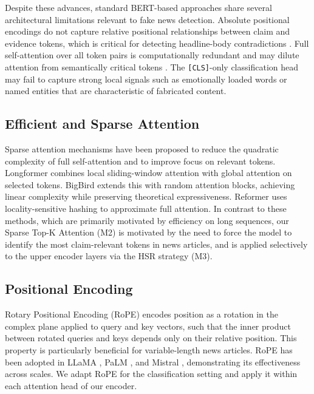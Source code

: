 \documentclass[conference]{IEEEtran}
\begin{document}
Despite these advances, standard BERT-based approaches share several architectural limitations relevant to fake news detection. Absolute positional encodings do not capture relative positional relationships between claim and evidence tokens, which is critical for detecting headline-body contradictions \cite{su2021rope}. Full self-attention over all token pairs is computationally redundant and may dilute attention from semantically critical tokens \cite{zaheer2020bigbird, beltagy2020longformer}. The \texttt{[CLS]}-only classification head may fail to capture strong local signals such as emotionally loaded words or named entities that are characteristic of fabricated content.

\subsection{Efficient and Sparse Attention}

Sparse attention mechanisms have been proposed to reduce the quadratic complexity of full self-attention and to improve focus on relevant tokens. Longformer \cite{beltagy2020longformer} combines local sliding-window attention with global attention on selected tokens. BigBird \cite{zaheer2020bigbird} extends this with random attention blocks, achieving linear complexity while preserving theoretical expressiveness. Reformer \cite{kitaev2020reformer} uses locality-sensitive hashing to approximate full attention. In contrast to these methods, which are primarily motivated by efficiency on long sequences, our Sparse Top-K Attention (M2) is motivated by the need to force the model to identify the most claim-relevant tokens in news articles, and is applied selectively to the upper encoder layers via the HSR strategy (M3).

\subsection{Positional Encoding}

Rotary Positional Encoding (RoPE) \cite{su2021rope} encodes position as a rotation in the complex plane applied to query and key vectors, such that the inner product between rotated queries and keys depends only on their relative position. This property is particularly beneficial for variable-length news articles. RoPE has been adopted in LLaMA \cite{touvron2023llama}, PaLM \cite{chowdhery2023palm}, and Mistral \cite{jiang2023mistral}, demonstrating its effectiveness across scales. We adapt RoPE for the classification setting and apply it within each attention head of our encoder.
\end{document}
